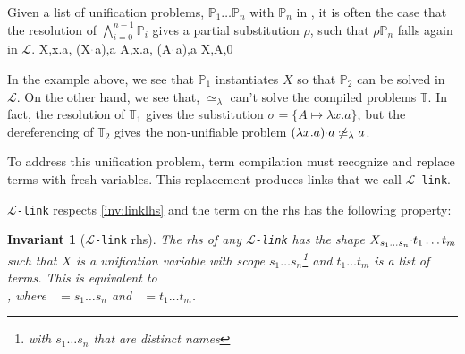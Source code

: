 \documentclass[sigconf,natbib=false,review]{acmart}
\newtheorem{invariant}{Invariant}
\newcommand{\appsep}{\ensuremath{\textcolor{lightgray}{\cdot}}}
\newcommand{\UnifRel}{\ensuremath{\simeq}}
\newcommand{\nUnifRel}{\ensuremath{\not\simeq}}
\newcommand{\Ue}{\ensuremath{\UnifRel_\lambda}\xspace}
\newcommand{\nUe}{\ensuremath{\nUnifRel_\lambda}\xspace}
\newcommand{\llambda}{\ensuremath{\mathcal{L}}\xspace}
\newcommand{\linkMacro}[1]{\ensuremath{#1}\texttt{-link}\xspace}
\newcommand{\linkbeta}{\linkMacro{\llambda}}
\newcommand{\linkbetaM}[3]{\ensuremath{#1 \vdash #2 =_{\llambda} #3}}
\newcommand{\rhs}{rhs\xspace}
\newcommand{\linkStore}{\texorpdfstring{\ensuremath{\mathbb{L}}\xspace}{L}}
\newcommand{\foUnifPb}{\ensuremath{\mathbb{P}}\xspace}
\newcommand{\hoUnifPb}{\ensuremath{\mathbb{T}}\xspace}
\begin{document}
Given a list of unification problems, $\foUnifPb_1\dots
\foUnifPb_n$ with $\foUnifPb_n$ in \notllambda, it is often the case that the resolution of
$\bigwedge_{i=0}^{n-1}\foUnifPb_i$ gives a partial substitution $\rho$, such
that $\rho\foUnifPb_n$ falls again in \llambda.
%
\printAlll
  {{{X,\lambda x.a},
    {(X\appsep a),a}}}
  {{{A,\lambda x.a},
    {(A\appsep a),a}}}
  {{{X,A,0}}}
  {{}}

In the example above, we see that $\foUnifPb_1$ instantiates $X$ so that
$\foUnifPb_2$ can be solved in \llambda.
On the other hand, we see that, 
\Ue can't solve the compiled problems \hoUnifPb. In
fact, the resolution of $\hoUnifPb_1$ gives the substitution $\sigma = \{ A
\mapsto \lambda x. a\}$, but the dereferencing of $\hoUnifPb_2$ gives the 
non-unifiable problem $(\lambda x. a) \appsep a \nUe a$.

To address
this unification problem, term compilation must recognize and replace
\notllambda terms with fresh variables.
This replacement produces links that we call \linkbeta.

\linkbeta respects \cref{inv:linklhs} and the term on the \rhs has the
following property:

\newcommand{\rhsBetaHead}{\ensuremath{X_{s_1\dots s_n}}}
\newcommand{\rhsBeta}{\ensuremath{\rhsBetaHead\appsep t_1\dots t_m}\xspace}

\begin{invariant}[\linkbeta \rhs]
  The \rhs of any \linkbeta has the shape \rhsBeta such that $X$ is a
  unification variable with scope $s_1\dots s_n$\footnote{with $s_1\dots s_n$
  that are distinct names} and $t_1\dots t_m$ is a list of terms. This is
  equivalent to \\, where ~$= s_1\dots s_n$
  and ~$=t_1\dots t_m$.
  \label{inv:beta-rhs}
\end{invariant}




\end{document}

